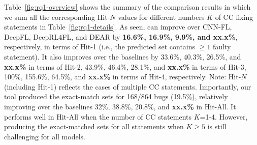 
Table~\ref{fig:rq1-overview} shows the summary of the comparison
results in which we sum all the corresponding Hit-$N$ values for
different numbers $K$ of CC fixing statements in
Table~\ref{fig:rq1-details}.
%
As seen, {\tool} can improve over CNN-FL, DeepFL, DeepRL4FL, and DEAR
by {\bf 16.6\%, 16.9\%, 9.9\%, and xx.x\%}, respectively, in terms of
Hit-1 (i.e., the predicted set contains $\geq 1$ faulty statement).
%
%
It also improves over the baselines by 33.6\%, 40.3\%, 26.5\%,
and {\bf xx.x\%} in terms of Hit-2, 43.9\%, 46.4\%, 28.1\%, and {\bf
xx.x\%} in terms of Hit-3, 100\%, 155.6\%, 64.5\%, and {\bf xx.x\%} in
terms of Hit-4, respectively. Note: Hit-$N$ (including Hit-1) reflects
the cases of multiple CC statements.
%
Importantly, our tool produced the exact-match sets for 168/864 bugs
(19.5\%), relatively improving over the baselines 32\%, 38.8\%,
20.8\%, and {\bf xx.x\%} in Hit-All. It performs well in Hit-All
when the number of CC statements $K$=1-4. However, producing the
exact-matched sets for all statements when $K \geq 5$ is still
challenging for all models.











